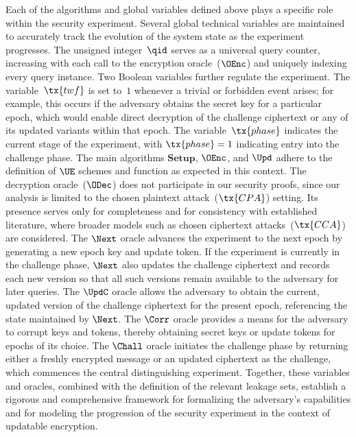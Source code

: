 \documentclass{fundam}
\begin{document}
\vspace{0.5cm}

Each of the algorithms and global variables defined above plays a specific role within the security experiment. Several global technical variables are maintained to accurately track the evolution of the system state as the experiment progresses. The unsigned integer~$\qid$ serves as a universal query counter, increasing with each call to the encryption oracle~($\OEnc$) and uniquely indexing every query instance. Two Boolean variables further regulate the experiment. The variable~$\tx{twf}$ is set to~$1$ whenever a trivial or forbidden event arises; for example, this occurs if the adversary obtains the secret key for a particular epoch, which would enable direct decryption of the challenge ciphertext or any of its updated variants within that epoch. The variable~$\tx{phase}$ indicates the current stage of the experiment, with $\tx{phase} = 1$ indicating entry into the challenge phase. The main algorithms $\mathbf{Setup}$, $\OEnc$, and $\Upd$ adhere to the definition of $\UE$ schemes and function as expected in this context. The decryption oracle~($\ODec$) does not participate in our security proofs, since our analysis is limited to the chosen plaintext attack~($\tx{CPA}$) setting. Its presence serves only for completeness and for consistency with established literature, where broader models such as chosen ciphertext attacks~($\tx{CCA}$) are considered. The $\Next$ oracle advances the experiment to the next epoch by generating a new epoch key and update token. If the experiment is currently in the challenge phase, $\Next$ also updates the challenge ciphertext and records each new version so that all such versions remain available to the adversary for later queries. The $\UpdC$ oracle allows the adversary to obtain the current, updated version of the challenge ciphertext for the present epoch, referencing the state maintained by $\Next$. The $\Corr$ oracle provides a means for the adversary to corrupt keys and tokens, thereby obtaining secret keys or update tokens for epochs of its choice. The $\Chall$ oracle initiates the challenge phase by returning either a freshly encrypted message or an updated ciphertext as the challenge, which commences the central distinguishing experiment. Together, these variables and oracles, combined with the definition of the relevant leakage sets, establish a rigorous and comprehensive framework for formalizing the adversary’s capabilities and for modeling the progression of the security experiment in the context of updatable encryption.
\end{document}
